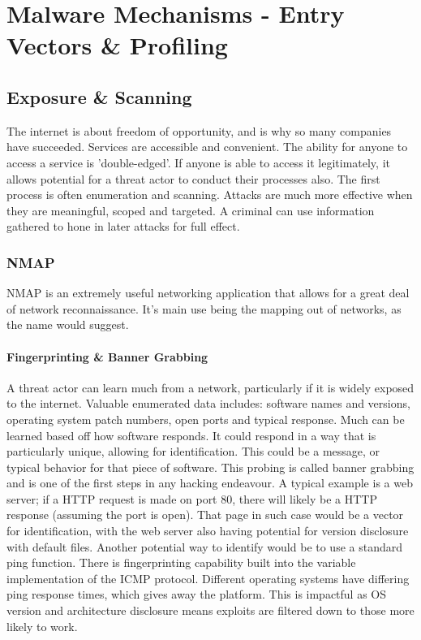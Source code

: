 \chapter{Malware Mechanisms - Entry Vectors \& Profiling}
\section{Exposure \& Scanning}
The internet is about freedom of opportunity, and is why so many companies have succeeded. Services are accessible and convenient. The ability for anyone to access a service is 'double-edged'.
If anyone is able to access it legitimately, it allows potential for a threat actor to conduct their processes also. The first process is often enumeration and scanning. Attacks are much more effective when they are meaningful, scoped and targeted.
A criminal can use information gathered to hone in later attacks for full effect.  

\subsection{NMAP}
NMAP is an extremely useful networking application that allows for a great deal of network reconnaissance. It's main use being the mapping out of networks, as the name would suggest.

\subsubsection{Fingerprinting \& Banner Grabbing}
A threat actor can learn much from a network, particularly if it is widely exposed to the internet. Valuable enumerated data includes: software names and versions, operating system patch numbers, open ports and typical response.
Much can be learned based off how software responds. It could respond in a way that is particularly unique, allowing for identification. This could be a message, or typical behavior for that piece of software.
This probing is called banner grabbing and is one of the first steps in any hacking endeavour. A typical example is a web server; if a HTTP request is made on port 80, there will likely be a HTTP response (assuming the port is open).
That page in such case would be a vector for identification, with the web server also having potential for version disclosure with default files. Another potential way to identify would be to use a standard ping function. 
There is fingerprinting capability built into the variable implementation of the ICMP protocol. Different operating systems have differing ping response times, which gives away the platform. 
This is impactful as OS version and architecture disclosure means exploits are filtered down to those more likely to work.

